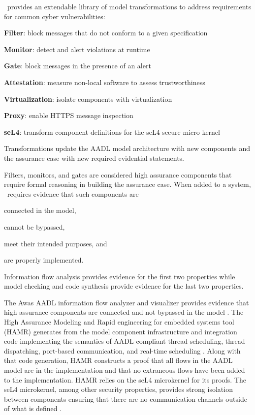 \brfcs\ provides an extendable library of model transformations to address requirements for common cyber vulnerabilities:
\begin{compactitem}
	\item \textbf{Filter}: block messages that do not conform to a given specification
	\item \textbf{Monitor}: detect and alert violations at runtime
	\item \textbf{Gate}: block messages in the presence of an alert
	\item \textbf{Attestation}: measure non-local software to assess trustworthiness
	\item \textbf{Virtualization}: isolate components with virtualization
	\item \textbf{Proxy}: enable HTTPS message inspection 
	\item \textbf{seL4}: transform component definitions for the seL4 secure micro kernel
\end{compactitem}
Transformations update the AADL model architecture with new components and the assurance case with new required evidential statements.

Filters, monitors, and gates are considered high assurance components that require formal reasoning in building the assurance case.
When added to a system, \brfcs\ requires evidence that such components are 
\begin{compactenum}
	\item connected in the model, 
	\item cannot be bypassed, 
	\item meet their intended purposes, and
	\item are properly implemented.
\end{compactenum}
Information flow analysis provides evidence for the first two properties while model checking and code synthesis provide evidence for the last two properties.

The Awas AADL information flow analyzer and visualizer provides evidence that high assurance components are connected and not bypassed in the model \cite{awas}.
The High Assurance Modeling and Rapid engineering for embedded systems tool (HAMR) generates from the model component infrastructure and integration code implementing the semantics of AADL-compliant thread scheduling, thread dispatching, port-based communication, and real-time scheduling \cite{hamr}.
Along with that code generation, HAMR constructs a proof that all flows in the AADL model are in the implementation and that no extraneous flows have been added to the implementation.
HAMR relies on the seL4 microkernel for its proofs.
The seL4 microkernel, among other security properties, provides strong isolation between components ensuring that there are no communication channels outside of what is defined \cite{sel4-sosp09, sel4-tocs14, sel4-cacm18}.

